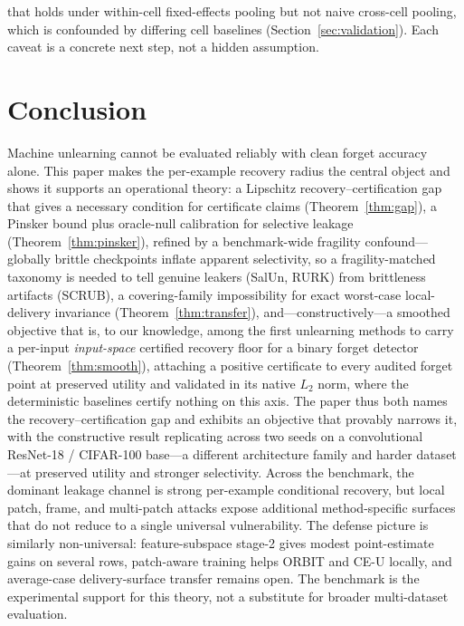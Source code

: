 \documentclass[11pt]{article}
\begin{document}
that holds under within-cell fixed-effects pooling but not naive cross-cell pooling, which is confounded by differing cell baselines (Section~\ref{sec:validation}). Each caveat is a concrete next step, not a hidden assumption.

\FloatBarrier
\section{Conclusion}
Machine unlearning cannot be evaluated reliably with clean forget accuracy alone. This paper makes the per-example recovery radius the central object and shows it supports an operational theory: a Lipschitz recovery--certification gap that gives a necessary condition for certificate claims (Theorem~\ref{thm:gap}), a Pinsker bound plus oracle-null calibration for selective leakage (Theorem~\ref{thm:pinsker}), refined by a benchmark-wide fragility confound---globally brittle checkpoints inflate apparent selectivity, so a fragility-matched taxonomy is needed to tell genuine leakers (SalUn, RURK) from brittleness artifacts (SCRUB), a covering-family impossibility for exact worst-case local-delivery invariance (Theorem~\ref{thm:transfer}), and---constructively---a smoothed objective that is, to our knowledge, among the first unlearning methods to carry a per-input \emph{input-space} certified recovery floor for a binary forget detector (Theorem~\ref{thm:smooth}), attaching a positive certificate to every audited forget point at preserved utility and validated in its native $L_2$ norm, where the deterministic baselines certify nothing on this axis. The paper thus both names the recovery--certification gap and exhibits an objective that provably narrows it, with the constructive result replicating across two seeds on a convolutional ResNet-18 / CIFAR-100 base---a different architecture family and harder dataset---at preserved utility and stronger selectivity. Across the benchmark, the dominant leakage channel is strong per-example conditional recovery, but local patch, frame, and multi-patch attacks expose additional method-specific surfaces that do not reduce to a single universal vulnerability. The defense picture is similarly non-universal: feature-subspace stage-2 gives modest point-estimate gains on several rows, patch-aware training helps ORBIT and CE-U locally, and average-case delivery-surface transfer remains open. The benchmark is the experimental support for this theory, not a substitute for broader multi-dataset evaluation.

\clearpage
\appendix
\end{document}
